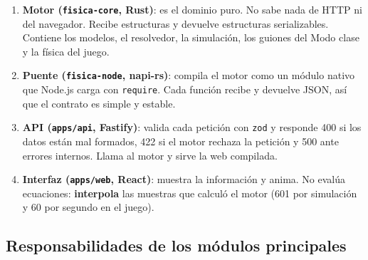 \documentclass[11pt,letterpaper]{article}
\begin{document}
\begin{enumerate}
  \item \textbf{Motor (\texttt{fisica-core}, Rust)}: es el dominio puro. No sabe nada de HTTP ni del navegador. Recibe estructuras y devuelve estructuras serializables. Contiene los modelos, el resolvedor, la simulación, los guiones del Modo clase y la física del juego.
  \item \textbf{Puente (\texttt{fisica-node}, napi-rs)}: compila el motor como un módulo nativo que Node.js carga con \texttt{require}. Cada función recibe y devuelve JSON, así que el contrato es simple y estable.
  \item \textbf{API (\texttt{apps/api}, Fastify)}: valida cada petición con \texttt{zod} y responde 400 si los datos están mal formados, 422 si el motor rechaza la petición y 500 ante errores internos. Llama al motor y sirve la web compilada.
  \item \textbf{Interfaz (\texttt{apps/web}, React)}: muestra la información y anima. No evalúa ecuaciones: \textbf{interpola} las muestras que calculó el motor (601 por simulación y 60 por segundo en el juego).
\end{enumerate}

\subsection{Responsabilidades de los módulos principales}
\end{document}
